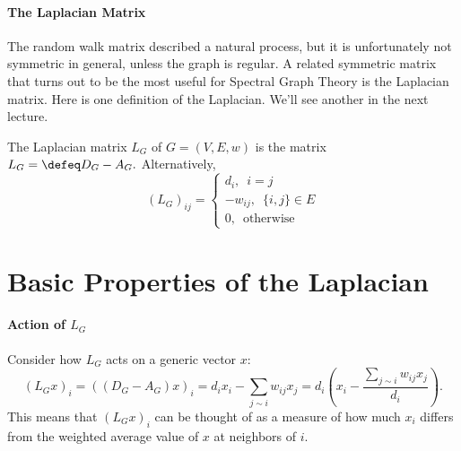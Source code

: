 \paragraph{The Laplacian Matrix} The random walk matrix described a natural process, but it is unfortunately not symmetric in general, unless the graph is regular. A related symmetric matrix that turns out to be the most useful for Spectral Graph Theory is the Laplacian matrix. Here is one definition of the Laplacian. We'll see another in the next lecture.

\begin{definition}
The Laplacian matrix $L_G$ of $G=(V,E,w)$ is the matrix $L_G = \defeq D_G - A_G.$ Alternatively,
$$
(L_G)_ {ij}= 
							\begin{cases}
							d_i, \enspace i=j\\
							-w_{ij}, \enspace \{i,j\} \in E \\
							0,       \enspace \textrm{otherwise}
							\end{cases}
$$
\end{definition}


\section{Basic Properties of the Laplacian}

\paragraph{Action of $L_G$}
Consider how $L_G$ acts on a generic vector $x$:
$$
(L_G x)_i = ((D_G - A_G) x)_i = d_i x_i - \sum_{j \sim i} w_{ij} x_j = d_i \left(x_i - \frac{\sum_{j \sim i} w_{ij} x_j}{d_i}\right).
$$
This means that $(L_G x)_i$ can be thought of as a measure of how much $x_i$ differs from the weighted average value of $x$ at neighbors of $i.$ 

